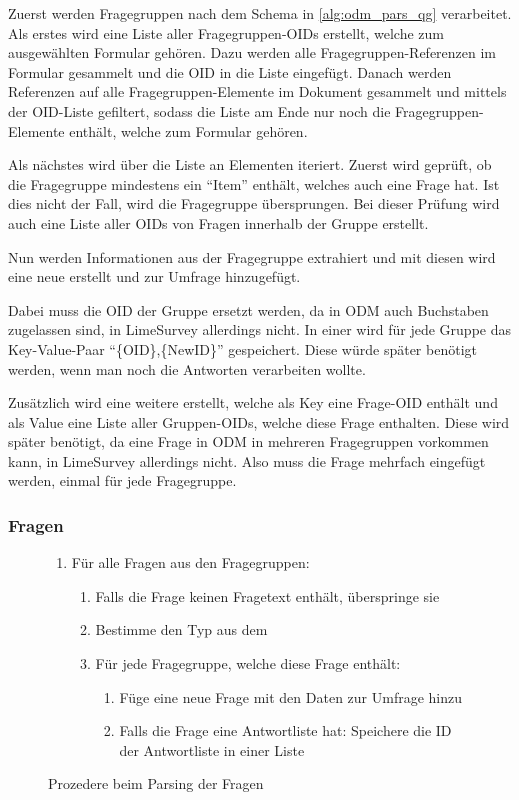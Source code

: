 Zuerst werden Fragegruppen nach dem Schema in \cref{alg:odm_pars_qg} verarbeitet.
Als erstes wird eine Liste aller Fragegruppen-OIDs erstellt, welche zum ausgewählten Formular gehören.
Dazu werden alle Fragegruppen-Referenzen im Formular gesammelt und die OID in die Liste eingefügt.
Danach werden Referenzen auf alle Fragegruppen-Elemente im Dokument gesammelt und mittels der OID-Liste gefiltert, sodass die Liste am Ende nur noch die Fragegruppen-Elemente enthält, welche zum Formular gehören.

Als nächstes wird über die Liste an Elementen iteriert.
Zuerst wird geprüft, ob die Fragegruppe mindestens ein \enquote{Item} enthält, welches auch eine Frage hat.
Ist dies nicht der Fall, wird die Fragegruppe übersprungen.
Bei dieser Prüfung wird auch eine Liste aller OIDs von Fragen innerhalb der Gruppe erstellt.

Nun werden Informationen aus der Fragegruppe extrahiert und mit diesen wird eine neue  erstellt und zur Umfrage hinzugefügt.

Dabei muss die OID der Gruppe ersetzt werden, da in ODM auch Buchstaben zugelassen sind, in LimeSurvey allerdings nicht.
In einer  wird für jede Gruppe das Key-Value-Paar \enquote{\{OID\},\{NewID\}} gespeichert.
Diese würde später benötigt werden, wenn man noch die Antworten verarbeiten wollte.

Zusätzlich wird eine weitere  erstellt, welche als Key eine Frage-OID enthält und als Value eine Liste aller Gruppen-OIDs, welche diese Frage enthalten.
Diese wird später benötigt, da eine Frage in ODM in mehreren Fragegruppen vorkommen kann, in LimeSurvey allerdings nicht.
Also muss die Frage mehrfach eingefügt werden, einmal für jede Fragegruppe.

\subsubsection{Fragen}

\begin{figure}[h]
	\begin{enumerate}
		\item Für alle Fragen aus den Fragegruppen:
			\begin{enumerate}
				\item Falls die Frage keinen Fragetext enthält, überspringe sie
				\item Bestimme den Typ aus dem 
				\item Für jede Fragegruppe, welche diese Frage enthält:
					\begin{enumerate}
						\item Füge eine neue Frage mit den Daten zur Umfrage hinzu
						\item Falls die Frage eine Antwortliste hat: Speichere die ID der Antwortliste in einer Liste
					\end{enumerate}
			\end{enumerate}
	\end{enumerate}
	\caption{Prozedere beim Parsing der Fragen}
	\label{alg:odm_pars_q}
\end{figure}


